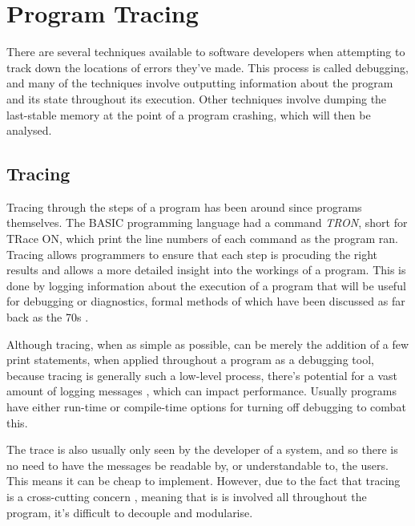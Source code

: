 \documentclass{UoYCSproject}
\begin{document}


\section{Program Tracing}
There are several techniques available to software developers when attempting to track down the locations of errors they've made. This process is called debugging, and many of the techniques involve outputting information about the program and its state throughout its execution. Other techniques involve dumping the last-stable memory at the point of a program crashing, which will then be analysed. 

\subsection{Tracing}
Tracing through the steps of a program has been around since programs themselves. The BASIC programming language had a command \emph{TRON}, short for TRace ON, which print the line numbers of each command as the program ran. 
Tracing allows programmers to ensure that each step is procuding the right results and allows a more detailed insight into the workings of a program. This is done by logging information about the execution of a program that will be useful for debugging or diagnostics, formal methods of which have been discussed as far back as the 70s \cite{psych_debug, code_walkthroughs}.

Although tracing, when as simple as possible, can be merely the addition of a few print statements, when applied throughout a program as a debugging tool, because tracing is generally such a low-level process, there's potential for a vast amount of logging messages \cite{}, which can impact performance. Usually programs have either run-time or compile-time options for turning off debugging to combat this. %

The trace is also usually only seen by the developer of a system, and so there is no need to have the messages be readable by, or understandable to, the users. This means it can be cheap to implement. However, due to the fact that tracing is a cross-cutting concern \cite{}, meaning that is is involved all throughout the program, it's difficult to decouple and modularise. %
\end{document}
